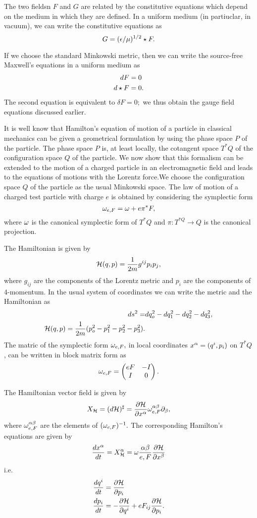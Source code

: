 The two fieldsn $F$ and $G$ are related by the constitutive equations which depend on the medium in which they are
defined. In a uniform medium (in partiuclar, in vacuum), we can write the constitutive equations as 
$$
G=(\epsilon/\mu)^{1/2}\star F.
$$

If we choose the standard Minkowski metric, then we can write the source-free Maxwell's equations in a uniform medium as
\begin{align*}
 dF&=0 \\
d \star F &= 0.
\end{align*}
The second equation is equivalent to $\delta F =0;$ we thus obtain the gauge field equations discussed earlier.


It is well know that Hamilton's equation of motion of a particle in classical mechanics can be given a geometrical
formulation by using the phase space $P$ of the particle. The phase space $P$ is, at least locally, the cotangent
space $T^{*}Q$ of the configuration space $Q$ of the particle. We now show that this formalism can be extended to the
motion of a charged particle in an electromagnetic field and leads to the equations of motions with the Lorentz
force.We choose the configuration space $Q$ of the particle as the usual Minkowski space. The law of motion of a
charged test particle with charge $e$ is obtained by considering the symplectic form
$$
\omega_{e,F}=\omega + e \pi^{*}F,
$$
where $\omega$ is the canonical symplectic form of $T^{*}Q$ and $\pi:T^{*Q} \to Q$ is the canonical projection.

The Hamiltonian is given by
$$
\mathcal{H}(q,p)=\frac{1}{2m}g^{ij}p_{i}p_{j},
$$
where $g_{ij}$ are the components of the Lorentz metric and $p_{i}$ are the components of 4-momentum. In the usual
system of coordinates we can write the metric and the Hamiltonian as
\begin{align*}
 ds^{2}=& dq_{o}^{2}-dq_{1}^{2}-dq_{2}^{2}-dq_{3}^{2},\\
\mathcal{H}(q,p)=\frac{1}{2m}(p_{o}^{2}-p_{1}^{2}-p_{2}^{2}-p_{3}^{2}).
\end{align*}
The matric of the symplectic form $\omega_{e, F},$ in local coordinates $x^{\alpha}=(q^{i}, p_{i})$ on $T^{*}Q$, can be
written in block matrix form as
$$
\omega_{e,F} =
\begin{pmatrix}
 eF & -I \\
I & 0
\end{pmatrix}.
$$

The Hamiltonian vector field is given by
$$
X_{\mathcal{H}}=(d\mathcal{H})^{\sharp}=\frac{\partial \mathcal{H}}{\partial x^{\alpha}} \omega^{\alpha \beta}_{e, F} \partial_{\beta},
$$
where $\omega^{\alpha \beta}_{e, F}$ are the elements of $(\omega_{e, F})^{-1}.$ The corresponding Hamilton's equations are
given by
$$
\frac{dx^{\alpha}}{dt}=X^{\alpha}_{\mathcal{H}}=\omega\frac{\alpha \beta}{e, F}\frac{\partial \mathcal{H}}{\partial x^{\beta}}
$$
i.e.
\begin{align}
 \label{MM:8.4}
\frac{dq^{i}}{dt}&=\frac{\partial \mathcal{H}}{\partial p_{i}} \\
\label{MM:8.5}
\frac{dp_{i}}{dt}&=-\frac{\partial \mathcal{H}}{\partial q^{i}}+eF_{ij}\frac{\partial \mathcal{H}}{\partial p_{i}}. 
\end{align}

